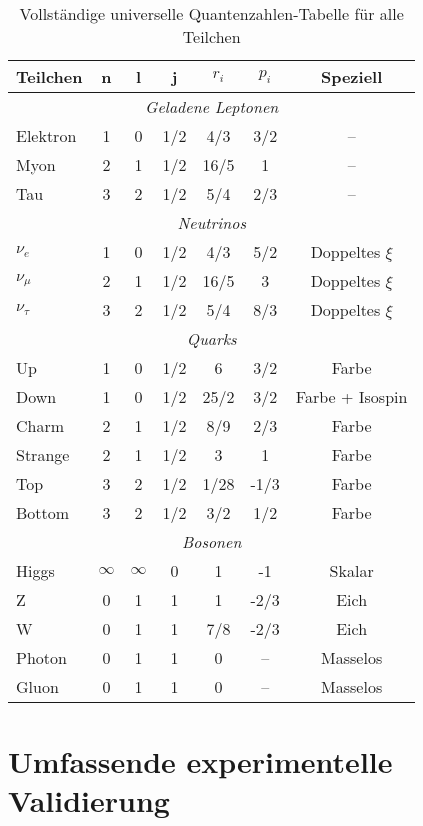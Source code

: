 \documentclass[12pt,a4paper]{article}
\begin{document}
	\begin{table}[H]
		\centering
		\begin{tabular}{lcccccc}
			\toprule
			\textbf{Teilchen} & \textbf{n} & \textbf{l} & \textbf{j} & \textbf{$r_i$} & \textbf{$p_i$} & \textbf{Speziell} \\
			\midrule
			\multicolumn{7}{c}{\textit{Geladene Leptonen}} \\
			\midrule
			Elektron & 1 & 0 & 1/2 & 4/3 & 3/2 & -- \\
			Myon & 2 & 1 & 1/2 & 16/5 & 1 & -- \\
			Tau & 3 & 2 & 1/2 & 5/4 & 2/3 & -- \\
			\midrule
			\multicolumn{7}{c}{\textit{Neutrinos}} \\
			\midrule
			$\nu_e$ & 1 & 0 & 1/2 & 4/3 & 5/2 & Doppeltes $\xi$ \\
			$\nu_\mu$ & 2 & 1 & 1/2 & 16/5 & 3 & Doppeltes $\xi$ \\
			$\nu_\tau$ & 3 & 2 & 1/2 & 5/4 & 8/3 & Doppeltes $\xi$ \\
			\midrule
			\multicolumn{7}{c}{\textit{Quarks}} \\
			\midrule
			Up & 1 & 0 & 1/2 & 6 & 3/2 & Farbe \\
			Down & 1 & 0 & 1/2 & 25/2 & 3/2 & Farbe + Isospin \\
			Charm & 2 & 1 & 1/2 & 8/9 & 2/3 & Farbe \\
			Strange & 2 & 1 & 1/2 & 3 & 1 & Farbe \\
			Top & 3 & 2 & 1/2 & 1/28 & -1/3 & Farbe \\
			Bottom & 3 & 2 & 1/2 & 3/2 & 1/2 & Farbe \\
			\midrule
			\multicolumn{7}{c}{\textit{Bosonen}} \\
			\midrule
			Higgs & $\infty$ & $\infty$ & 0 & 1 & -1 & Skalar \\
			Z & 0 & 1 & 1 & 1 & -2/3 & Eich \\
			W & 0 & 1 & 1 & 7/8 & -2/3 & Eich \\
			Photon & 0 & 1 & 1 & 0 & -- & Masselos \\
			Gluon & 0 & 1 & 1 & 0 & -- & Masselos \\
			\bottomrule
		\end{tabular}
		\caption{Vollständige universelle Quantenzahlen-Tabelle für alle Teilchen}
		\label{tab:universal_quantum_numbers}
	\end{table}
	
	\section{Umfassende experimentelle Validierung}
	\label{sec:comprehensive_validation}
	
\end{document}
